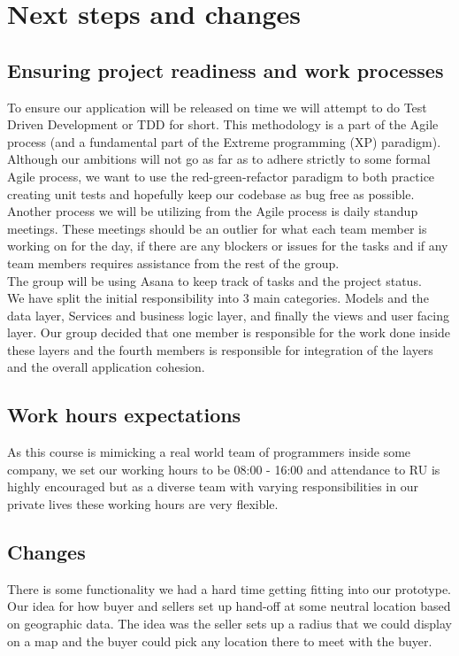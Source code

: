 \section{Next steps and changes}
\subsection{Ensuring project readiness and work processes}
To ensure our application will be released on time we will attempt to do Test Driven Development or TDD for short. This methodology is a part of the Agile process (and a fundamental part of the Extreme programming (XP) paradigm).
Although our ambitions will not go as far as to adhere strictly to some formal Agile process, we want to use the red-green-refactor paradigm to both practice creating unit tests and hopefully keep our codebase as bug free as possible.\\

Another process we will be utilizing from the Agile process is daily standup meetings. These meetings should be an outlier for what each team member is working on for the day, if there are any blockers or issues for the tasks and if any team members requires assistance from the rest of the group. \\

The group will be using Asana to keep track of tasks and the project status.\\

We have split the initial responsibility into 3 main categories. Models and the data layer, Services and business logic layer, and finally the views and user facing layer. Our group decided that one member is responsible for the work done inside these layers and the fourth members is responsible for integration of the layers and the overall application cohesion. \\

\subsection{Work hours expectations}
As this course is mimicking a real world team of programmers inside some company, we set our working hours to be 08:00 - 16:00 and attendance to RU is highly encouraged but as a diverse team with varying responsibilities in our private lives these working hours are very flexible.\\

\subsection{Changes}
There is some functionality we had a hard time getting fitting into our prototype. Our idea for how buyer and sellers set up hand-off at some neutral location based on geographic data. The idea was the seller sets up a radius that we could display on a map and the buyer could pick any location there to meet with the buyer.\\

